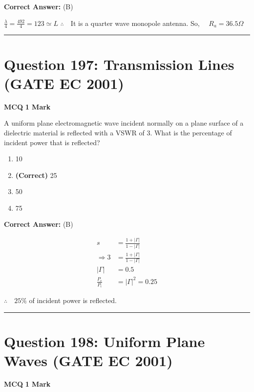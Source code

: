 \documentclass[11pt,a4paper]{article}
\begin{document}
\noindent \textbf{Correct Answer:} (B)

\begin{tcolorbox}[solbox, title=Detailed Solution -- Question 196]
$\frac{\lambda}{4}=\frac{492}{4}=123 \simeq L$
$\therefore \quad$It is a quarter wave monopole antenna.
 So, $\quad R_{a}=36.5 \Omega$
\end{tcolorbox}

\vspace{1.5em}
\hrule
\vspace{1.5em}

\section*{Question 197: Transmission Lines (GATE EC 2001)}
\noindent \textbf{\color{primary}MCQ} \hfill \textbf{\color{secondary}1 Mark}


\noindent A uniform plane electromagnetic wave incident normally on a plane surface of a
dielectric material is reflected with a VSWR of 3. What is the percentage of
incident power that is reflected?


\begin{enumerate}[label=(\Alph*)]
    \item 10%
    \item \textbf{(Correct)} 25%
    \item 50%
    \item 75%
\end{enumerate}

\noindent \textbf{Correct Answer:} (B)

\begin{tcolorbox}[solbox, title=Detailed Solution -- Question 197]
\[
\begin{aligned} s&=\frac{1+|\Gamma|}{1-|\Gamma|} \\ \Rightarrow 3&=\frac{1+|\Gamma|}{1-|\Gamma|} \\ |\Gamma|&=0.5 \\ \frac{P_{r}}{P_{i}}&=|\Gamma|^{2}=0.25 \end{aligned}
\]

$\therefore \quad 25 \%$ of incident power is reflected.
\end{tcolorbox}

\vspace{1.5em}
\hrule
\vspace{1.5em}

\section*{Question 198: Uniform Plane Waves (GATE EC 2001)}
\noindent \textbf{\color{primary}MCQ} \hfill \textbf{\color{secondary}1 Mark}
\end{document}

